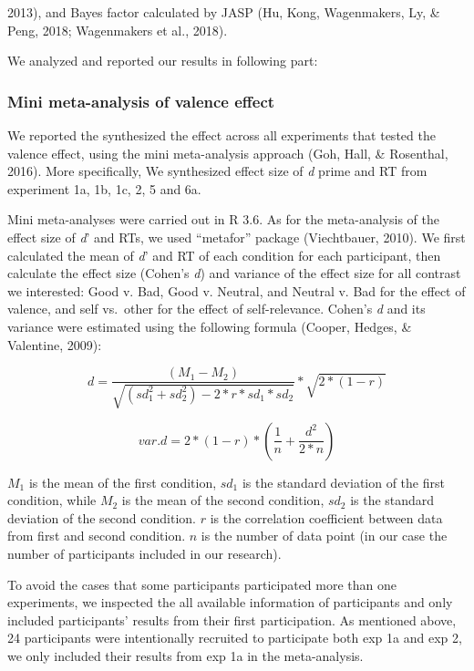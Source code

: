 \documentclass[man]{apa6}
\begin{document}
2013), and Bayes factor calculated by JASP (Hu, Kong, Wagenmakers, Ly, \& Peng, 2018; Wagenmakers et al., 2018).

We analyzed and reported our results in following part:

\hypertarget{mini-meta-analysis-of-valence-effect}{%
\subsubsection{Mini meta-analysis of valence effect}\label{mini-meta-analysis-of-valence-effect}}

We reported the synthesized the effect across all experiments that tested the valence effect, using the mini meta-analysis approach (Goh, Hall, \& Rosenthal, 2016). More specifically, We synthesized effect size of \emph{d} prime and RT from experiment 1a, 1b, 1c, 2, 5 and 6a.

Mini meta-analyses were carried out in R 3.6. As for the meta-analysis of the effect size of \emph{d}' and RTs, we used \enquote{metafor} package (Viechtbauer, 2010). We first calculated the mean of \emph{d}' and RT of each condition for each participant, then calculate the effect size (Cohen's \emph{d}) and variance of the effect size for all contrast we interested: Good v. Bad, Good v. Neutral, and Neutral v. Bad for the effect of valence, and self vs.~other for the effect of self-relevance. Cohen's \emph{d} and its variance were estimated using the following formula (Cooper, Hedges, \& Valentine, 2009):

\[d = \frac {(M_{1} - M_{2})}{\sqrt {(sd_{1}^2 + sd_{2}^2) - 2*r*sd_{1}*sd_{2}}} * \sqrt {2*(1-r)}\]

\[var.d = 2*(1-r) * (\frac{1}{n} + \frac{d^2}{2*n})\]

\(M_1\) is the mean of the first condition, \(sd_1\) is the standard deviation of the first condition, while \(M_2\) is the mean of the second condition, \(sd_2\) is the standard deviation of the second condition. \(r\) is the correlation coefficient between data from first and second condition. \(n\) is the number of data point (in our case the number of participants included in our research).

To avoid the cases that some participants participated more than one experiments, we inspected the all available information of participants and only included participants' results from their first participation. As mentioned above, 24 participants were intentionally recruited to participate both exp 1a and exp 2, we only included their results from exp 1a in the meta-analysis.
\end{document}
